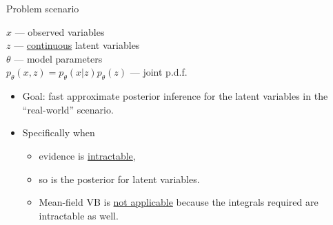 \documentclass[unicode,11pt]{beamer}
\begin{document}
\begin{frame}[fragile]{Problem scenario}
  \begin{center}
    \begin{minipage}[t]{.3\linewidth}
    \end{minipage}
    \begin{minipage}[t]{.55\linewidth}
      $x$ --- observed variables\\
      $z$ --- \underline{continuous} latent variables\\
      $\theta$ --- model parameters\\
      $p_{\theta}(x, z) = p_{\theta}(x|z) p_{\theta}(z)$ --- joint p.d.f.\\
    \end{minipage}
  \end{center}

  \begin{itemize}
  \item Goal: fast approximate posterior inference for the latent variables
    in the ``real-world'' scenario.
  \item Specifically when
    \begin{itemize}
    \item evidence is \underline{intractable},
    \item so is the posterior for latent variables.
    \item Mean-field VB is \underline{not applicable} because the integrals
      required are intractable as well.
    \end{itemize}
  \end{itemize}

\end{frame}
\end{document}
